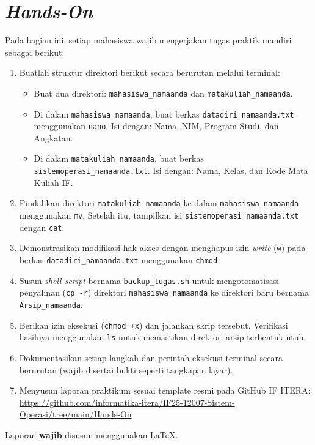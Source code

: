 \newpage
\section{\textit{Hands-On}}
\label{sec:m04-hands-on}

Pada bagian ini, setiap mahasiswa wajib mengerjakan tugas praktik mandiri sebagai berikut:

    \begin{enumerate}
    \item Buatlah struktur direktori berikut secara berurutan melalui terminal:
    \begin{itemize}
        \item Buat dua direktori: \texttt{mahasiswa\_namaanda} dan \texttt{matakuliah\_namaanda}.
        \item Di dalam \texttt{mahasiswa\_namaanda}, buat berkas \texttt{datadiri\_namaanda.txt} menggunakan \texttt{nano}. Isi dengan: Nama, NIM, Program Studi, dan Angkatan.
        \item Di dalam \texttt{matakuliah\_namaanda}, buat berkas \texttt{sistemoperasi\_namaanda.txt}. Isi dengan: Nama, Kelas, dan Kode Mata Kuliah IF.
    \end{itemize}
    \item Pindahkan direktori \texttt{matakuliah\_namaanda} ke dalam \texttt{mahasiswa\_namaanda} menggunakan \texttt{mv}. Setelah itu, tampilkan isi \texttt{sistemoperasi\_namaanda.txt} dengan \texttt{cat}.
    \item Demonstrasikan modifikasi hak akses dengan menghapus izin \textit{write} (\texttt{w}) pada berkas \texttt{datadiri\_namaanda.txt} menggunakan \texttt{chmod}.
    \item Susun \textit{shell script} bernama \texttt{backup\_tugas.sh} untuk mengotomatisasi penyalinan (\texttt{cp -r}) direktori \texttt{mahasiswa\_namaanda} ke direktori baru bernama \texttt{Arsip\_namaanda}.
    \item Berikan izin eksekusi (\texttt{chmod +x}) dan jalankan skrip tersebut. Verifikasi hasilnya menggunakan \texttt{ls} untuk memastikan direktori arsip terbentuk utuh.
    \item Dokumentasikan setiap langkah dan perintah eksekusi terminal secara berurutan (wajib disertai bukti seperti tangkapan layar).
    \item Menyusun laporan praktikum sesuai template resmi pada GitHub IF ITERA:
    \url{https://github.com/informatika-itera/IF25-12007-Sistem-Operasi/tree/main/Hands-On}
\end{enumerate}

Laporan \textbf{wajib} disusun menggunakan \LaTeX.